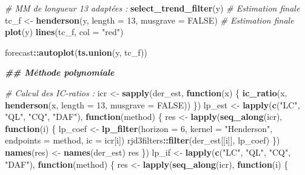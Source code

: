\documentclass[
  12pt,
  a4paper,french]{article}
\newenvironment{Shaded}{\begin{snugshade}}{\end{snugshade}}
\newcommand{\AttributeTok}[1]{\textcolor[rgb]{0.13,0.29,0.53}{#1}}
\newcommand{\CommentTok}[1]{\textcolor[rgb]{0.56,0.35,0.01}{\textit{#1}}}
\newcommand{\ConstantTok}[1]{\textcolor[rgb]{0.56,0.35,0.01}{#1}}
\newcommand{\ControlFlowTok}[1]{\textcolor[rgb]{0.13,0.29,0.53}{\textbf{#1}}}
\newcommand{\DecValTok}[1]{\textcolor[rgb]{0.00,0.00,0.81}{#1}}
\newcommand{\DocumentationTok}[1]{\textcolor[rgb]{0.56,0.35,0.01}{\textbf{\textit{#1}}}}
\newcommand{\FunctionTok}[1]{\textcolor[rgb]{0.13,0.29,0.53}{\textbf{#1}}}
\newcommand{\NormalTok}[1]{#1}
\newcommand{\OtherTok}[1]{\textcolor[rgb]{0.56,0.35,0.01}{#1}}
\newcommand{\SpecialCharTok}[1]{\textcolor[rgb]{0.81,0.36,0.00}{\textbf{#1}}}
\newcommand{\StringTok}[1]{\textcolor[rgb]{0.31,0.60,0.02}{#1}}
\newcommand\1{\mathds{1}}
\begin{document}
\begin{Shaded}
\begin{Highlighting}[]
\CommentTok{\# MM de longueur 13 adaptées : }
\FunctionTok{select\_trend\_filter}\NormalTok{(y)}
\CommentTok{\# Estimation finale}
\NormalTok{tc\_f }\OtherTok{\textless{}{-}} \FunctionTok{henderson}\NormalTok{(y, }\AttributeTok{length =} \DecValTok{13}\NormalTok{, }\AttributeTok{musgrave =} \ConstantTok{FALSE}\NormalTok{) }\CommentTok{\# Estimation finale}
\FunctionTok{plot}\NormalTok{(y)}
\FunctionTok{lines}\NormalTok{(tc\_f, }\AttributeTok{col =} \StringTok{"red"}\NormalTok{)}

\NormalTok{forecast}\SpecialCharTok{::}\FunctionTok{autoplot}\NormalTok{(}\FunctionTok{ts.union}\NormalTok{(y, tc\_f))}


\DocumentationTok{\#\# Méthode polynomiale}

\CommentTok{\# Calcul des IC{-}ratios : }
\NormalTok{icr }\OtherTok{\textless{}{-}} \FunctionTok{sapply}\NormalTok{(der\_est, }\ControlFlowTok{function}\NormalTok{(x) \{}
  \FunctionTok{ic\_ratio}\NormalTok{(x, }\FunctionTok{henderson}\NormalTok{(x, }\AttributeTok{length =} \DecValTok{13}\NormalTok{, }\AttributeTok{musgrave =} \ConstantTok{FALSE}\NormalTok{))}
\NormalTok{\})}
\NormalTok{lp\_est }\OtherTok{\textless{}{-}} \FunctionTok{lapply}\NormalTok{(}\FunctionTok{c}\NormalTok{(}\StringTok{"LC"}\NormalTok{, }\StringTok{"QL"}\NormalTok{, }\StringTok{"CQ"}\NormalTok{, }\StringTok{"DAF"}\NormalTok{), }\ControlFlowTok{function}\NormalTok{(method) \{}
\NormalTok{  res }\OtherTok{\textless{}{-}} \FunctionTok{lapply}\NormalTok{(}\FunctionTok{seq\_along}\NormalTok{(icr), }\ControlFlowTok{function}\NormalTok{(i) \{}
\NormalTok{    lp\_coef }\OtherTok{\textless{}{-}} \FunctionTok{lp\_filter}\NormalTok{(}\AttributeTok{horizon =} \DecValTok{6}\NormalTok{,}
                         \AttributeTok{kernel =} \StringTok{"Henderson"}\NormalTok{,}
                         \AttributeTok{endpoints =}\NormalTok{ method,}
                         \AttributeTok{ic =}\NormalTok{ icr[i])}
\NormalTok{    rjd3filters}\SpecialCharTok{::}\FunctionTok{filter}\NormalTok{(der\_est[[i]], lp\_coef)}
\NormalTok{  \})}
  \FunctionTok{names}\NormalTok{(res) }\OtherTok{\textless{}{-}} \FunctionTok{names}\NormalTok{(der\_est)}
\NormalTok{  res}
\NormalTok{\})}
\NormalTok{lp\_if }\OtherTok{\textless{}{-}} \FunctionTok{lapply}\NormalTok{(}\FunctionTok{c}\NormalTok{(}\StringTok{"LC"}\NormalTok{, }\StringTok{"QL"}\NormalTok{, }\StringTok{"CQ"}\NormalTok{, }\StringTok{"DAF"}\NormalTok{), }\ControlFlowTok{function}\NormalTok{(method) \{}
\NormalTok{  res }\OtherTok{\textless{}{-}} \FunctionTok{lapply}\NormalTok{(}\FunctionTok{seq\_along}\NormalTok{(icr), }\ControlFlowTok{function}\NormalTok{(i) \{}

\end{Highlighting}
\end{Shaded}
\end{document}
